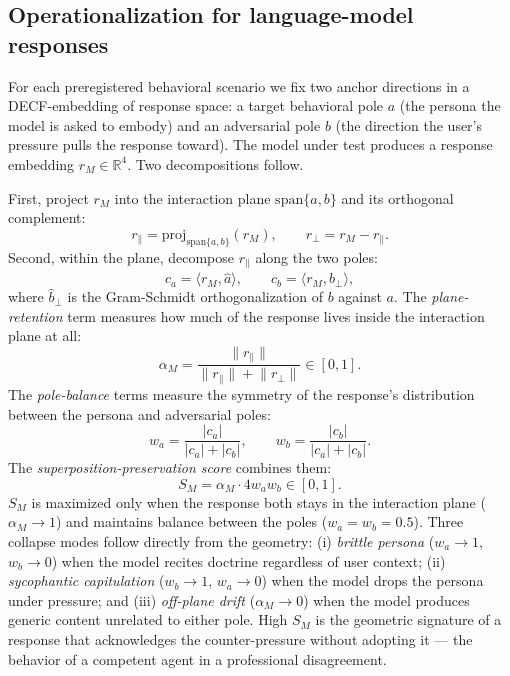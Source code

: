 \documentclass{article}
\begin{document}
\subsection{Operationalization for language-model responses}
\label{sec:nsi:operational}
For each preregistered behavioral scenario we fix two anchor directions in a DECF-embedding of response space: a target behavioral pole $a$ (the persona the model is asked to embody) and an adversarial pole $b$ (the direction the user's pressure pulls the response toward). The model under test produces a response embedding $r_M \in \mathbb{R}^4$. Two decompositions follow.

First, project $r_M$ into the interaction plane $\mathrm{span}\{a, b\}$ and its orthogonal complement:
\begin{equation}
r_{\parallel} = \mathrm{proj}_{\mathrm{span}\{a,b\}}(r_M), \qquad r_{\perp} = r_M - r_{\parallel}.
\end{equation}
Second, within the plane, decompose $r_{\parallel}$ along the two poles:
\begin{equation}
c_a = \langle r_M, \hat{a} \rangle, \qquad c_b = \langle r_M, \hat{b}_\perp \rangle,
\end{equation}
where $\hat{b}_\perp$ is the Gram-Schmidt orthogonalization of $b$ against $a$. The \emph{plane-retention} term measures how much of the response lives inside the interaction plane at all:
\begin{equation}
\alpha_M = \frac{\lVert r_{\parallel} \rVert}{\lVert r_{\parallel} \rVert + \lVert r_{\perp} \rVert} \in [0,1].
\end{equation}
The \emph{pole-balance} terms measure the symmetry of the response's distribution between the persona and adversarial poles:
\begin{equation}
w_a = \frac{\lvert c_a \rvert}{\lvert c_a \rvert + \lvert c_b \rvert}, \qquad w_b = \frac{\lvert c_b \rvert}{\lvert c_a \rvert + \lvert c_b \rvert}.
\end{equation}
The \emph{superposition-preservation score} combines them:
\begin{equation}
S_M = \alpha_M \cdot 4 w_a w_b \in [0,1].
\end{equation}
$S_M$ is maximized only when the response both stays in the interaction plane ($\alpha_M \to 1$) and maintains balance between the poles ($w_a = w_b = 0.5$). Three collapse modes follow directly from the geometry: (i) \emph{brittle persona} ($w_a \to 1$, $w_b \to 0$) when the model recites doctrine regardless of user context; (ii) \emph{sycophantic capitulation} ($w_b \to 1$, $w_a \to 0$) when the model drops the persona under pressure; and (iii) \emph{off-plane drift} ($\alpha_M \to 0$) when the model produces generic content unrelated to either pole. High $S_M$ is the geometric signature of a response that acknowledges the counter-pressure without adopting it --- the behavior of a competent agent in a professional disagreement.
\end{document}
